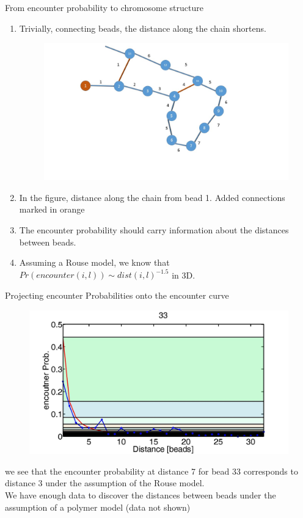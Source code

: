 \documentclass[8pt]{beamer}
\begin{document}
\begin{frame}{From encounter probability to chromosome structure}
\begin{enumerate}
\item Trivially, connecting beads, the distance along the chain shortens.
\begin{figure}[H]
\includegraphics[scale=0.15]{connectedBeadsAndDistanceAlongTheChain}
\end{figure}
\item In the figure, distance along the chain from bead 1. Added connections marked in orange
\item The encounter probability should carry information about the distances between beads. 
\item Assuming a Rouse model, we know that $Pr(encounter(i,l))\sim dist(i,l)^{-1.5}$ in 3D. 
\end{enumerate}
\end{frame}

\begin{frame}{Projecting encounter Probabilities onto the encounter curve}
\begin{figure}[H]
\includegraphics[scale=0.15]{encounterProbProjectedDist33}
\end{figure}
we see that the encounter probability at distance 7 for bead 33 corresponds to distance 3 under the assumption of the Rouse model.\\

We have enough data to discover the distances between beads under the assumption of a polymer model (data not shown)

\end{frame}
\end{document}
